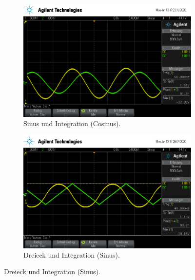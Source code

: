                 \begin{figure}
                    \centering
                    \begin{subfigure}{0.48\textwidth}
                        \centering
                        \includegraphics[width=\textwidth]{scope_5.png}%
                        \caption{Sinus und Integration (Cosinus).}
                        \label{fig:TU}
                    \end{subfigure}
                    \begin{subfigure}{0.48\textwidth}
                        \centering
                        \includegraphics[width=\textwidth]{scope_7.png}%
                        \caption{Dreieck und Integration (Sinus).}
                        \label{fig:TU}

\end{subfigure}
\end{figure}
